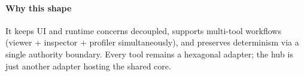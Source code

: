 \paragraph{Why this shape}
It keeps UI and runtime concerns decoupled, supports multi-tool workflows (viewer + inspector + profiler simultaneously), and preserves determinism via a single authority boundary. Every tool remains a hexagonal adapter; the hub is just another adapter hosting the shared core.

